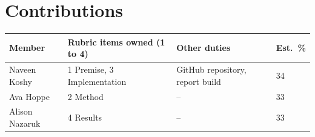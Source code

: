 \section{Contributions}\label{sec:contributions}

\begin{center}
\begin{tabular}{@{}llll@{}}
\toprule
Member & Rubric items owned (1 to 4) & Other duties & Est.\ \% \\
\midrule
Naveen Koshy & 1 Premise, 3 Implementation & GitHub repository, report build & 34 \\
Ava Hoppe & 2 Method & -- & 33 \\
Alison Nazaruk & 4 Results & -- & 33 \\
\bottomrule
\end{tabular}
\end{center}
